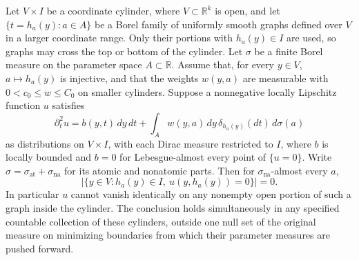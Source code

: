 \begin{lemma}
\label{lem:variation:non-atomic-slicing}
Let $V\times I$ be a coordinate cylinder, where
$V\subset\mathbb R^k$ is open, and let
$\{t=h_a(y):a\in A\}$ be a Borel family of uniformly smooth
graphs defined over $V$ in a larger coordinate range.  Only their
portions with $h_a(y)\in I$ are used, so graphs may cross the top or
bottom of the cylinder.  Let $\sigma$ be a finite Borel measure on the parameter
space $A\subset\mathbb R$.  Assume that, for every $y\in V$,
$a\mapsto h_a(y)$ is injective, and that the weights $w(y,a)$ are
measurable with $0<c_0\leq w\leq C_0$ on smaller cylinders.
Suppose a nonnegative locally Lipschitz function $u$ satisfies
\[
 \partial_t^2u=b(y,t)\,dy\,dt+
 \int_Aw(y,a)\,dy\,\delta_{h_a(y)}(dt)\,d\sigma(a)
\]
as distributions on $V\times I$, with each Dirac measure restricted
to $I$, where $b$ is locally bounded and
$b=0$ for Lebesgue-almost every point of $\{u=0\}$.
Write $\sigma=\sigma_{\mathrm{at}}+\sigma_{\mathrm{na}}$ for its
atomic and nonatomic parts.  Then for
$\sigma_{\mathrm{na}}$-almost every $a$,
\[
 |\{y\in V:h_a(y)\in I,\ u(y,h_a(y))=0\}|=0.
\]
In particular $u$ cannot vanish identically on any nonempty open
portion of such a graph inside the cylinder.
The conclusion holds simultaneously in any specified countable
collection of these cylinders, outside one null set of the original
measure on minimizing boundaries from which their parameter
measures are pushed forward.
\end{lemma}

